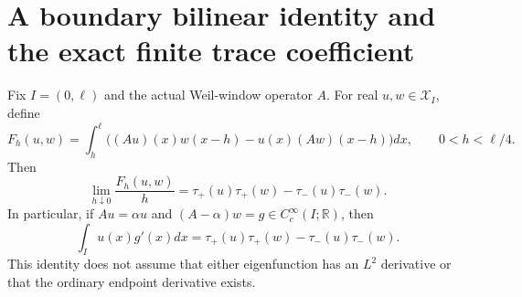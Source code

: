 \section{A boundary bilinear identity and the exact finite trace coefficient}
\label{sec:spectral-boundary-flux}

\begin{lemma}
\label{AC-S43-flux}
Fix \(I=(0,\ell)\) and the actual Weil-window operator \(A\).
For real \(u,w\in\mathcal X_I\), define
\[
 F_h(u,w)=\int_h^\ell
        \bigl((Au)(x)w(x-h)-u(x)(Aw)(x-h)\bigr)dx,
                  \qquad 0<h<\ell/4.
                                                        \tag{BT.1}
\]
Then
\[
 \lim_{h\downarrow0}\frac{F_h(u,w)}h
       =\tau_+(u)\tau_+(w)-\tau_-(u)\tau_-(w).           \tag{BT.2}
\]
In particular, if \(Au=\alpha u\) and
\((A-\alpha)w=g\in C_c^\infty(I;\mathbb R)\), then
\[
 \int_Iu(x)g'(x)dx
       =\tau_+(u)\tau_+(w)-\tau_-(u)\tau_-(w).           \tag{BT.3}
\]
This identity does not assume that either eigenfunction has an
\(L^2\) derivative or that the ordinary endpoint derivative exists.
\end{lemma}
